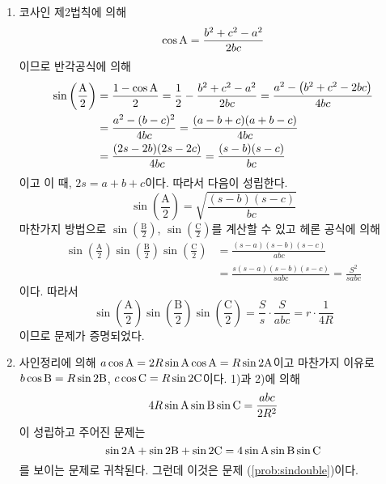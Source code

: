 \documentclass[11pt, a4paper]{book}
\begin{document}
\begin{problem}
{\begin{psolution}
\begin{enumerate}[label=\arabic*)]
\begin{equation*}
	\end{equation*}
	이 식에 사인정리를 적용하면 다음이 성립한다.
	\begin{align*}
		4R^{2} \sinrm{A}\sinrm{B}\sinrm{C} &= bc \sinrm{A} = r(a+b+c)\\
		&= 2rR \left(\sinrm{A}+\sinrm{B}+\sinrm{C}\right)
	\end{align*}
이고 이 식의 양변을 $2R^{2}$으로 나누면 주어진 식이 증명된다.
	\item 코사인 제2법칙에 의해
	\begin{equation*}
		\cos \textrm{A} =\frac{b^{2}+c^{2}-a^{2}}{2bc}
	\end{equation*}
이므로 반각공식에 의해
	\begin{align*}
		\sin\left(\frac{\textrm{A}}{2}\right) &= \frac{1-\cos \textrm{A}}{2} = \frac{1}{2} -\frac{b^{2}+c^{2}-a^{2}}{2bc} = \frac{a^{2}-\left(b^{2}+c^{2}-2bc\right)}{4bc} \\
		&= \frac{a^{2}-(b-c)^{2}}{4bc} =\frac{(a-b+c)(a+b-c)}{4bc} \\
		&= \frac{(2s-2b)(2s-2c)}{4bc} =\frac{(s-b)(s-c)}{bc}
	\end{align*}
이고 이 때, $2s=a+b+c$이다. 따라서 다음이 성립한다.
	\begin{equation*}
		\sin\left(\frac{\textrm{A}}{2}\right) = \sqrt{\frac{(s-b)(s-c)}{bc}}
	\end{equation*}
마찬가지 방법으로 $\sin\left(\frac{\textrm{B}}{2}\right)$, $\sin\left(\frac{\textrm{C}}{2}\right)$를 계산할 수 있고 헤론 공식에 의해
	\begin{align*}
		\sin\left(\frac{\textrm{A}}{2}\right)	\sin\left(\frac{\textrm{B}}{2}\right)	\sin\left(\frac{\textrm{C}}{2}\right) &= \frac{(s-a)(s-b)(s-c)}{abc} \\
		&= \frac{s(s-a)(s-b)(s-c)}{sabc} =\frac{S^{2}}{sabc}
	\end{align*}
이다. 따라서
\begin{equation*}
		\sin\left(\frac{\textrm{A}}{2}\right)	\sin\left(\frac{\textrm{B}}{2}\right)	\sin\left(\frac{\textrm{C}}{2}\right) =\frac{S}{s}\cdot \frac{S}{abc} =r \cdot\frac{1}{4R}
\end{equation*}
이므로 문제가 증명되었다.
	\item 사인정리에 의해 $a \cos \textrm{A}=2R \sin \textrm{A}\cos \textrm{A}=R \sin \textrm{2A}$이고 마찬가지 이유로 $b \cos \textrm{B}=R \sin \textrm{2B}$, $c\cos \textrm{C}=R \sin \textrm{2C}$이다. 1)과 2)에 의해 
	\begin{equation*}
		4R \sin \textrm{A}\sin \textrm{B}\sin \textrm{C} =\frac{abc}{2R^{2}}
	\end{equation*}
이 성립하고 주어진 문제는
\begin{equation*}
	\sin \textrm{2A}+\sin \textrm{2B}+\sin \textrm{2C} = 4 \sin \textrm{A}\sin \textrm{B}\sin \textrm{C}
\end{equation*}
를 보이는 문제로 귀착된다. 그런데 이것은 문제 (\ref{prob:sindouble})이다.
	\end{enumerate}
\end{psolution}
}
\end{problem}
\end{document}
